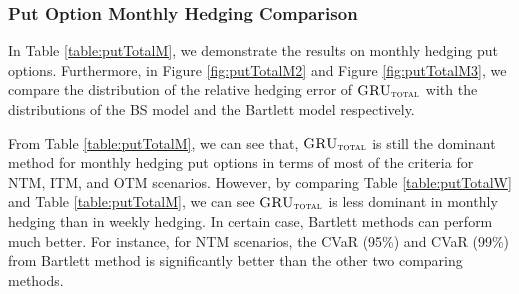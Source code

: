 \documentclass[letterpaper,12pt,titlepage,oneside,final]{book}
\numberwithin{equation}{section}
\theoremstyle{definition}
\newcommand{\modelT}{\textsc{GRU}_{\textsc{total}}}
\begin{document}
\newpage
\subsubsection{Put Option Monthly Hedging Comparison}
In Table \ref{table:putTotalM}, we demonstrate the results on monthly hedging put options. Furthermore, in Figure \ref{fig:putTotalM2} and  Figure \ref{fig:putTotalM3}, we compare the distribution of the relative hedging error of $\modelT$ with the distributions of the BS model and the Bartlett model respectively.

From Table \ref{table:putTotalM}, we can see that, $\modelT$ is still the dominant  method for monthly hedging put options in terms of most of the criteria for NTM, ITM, and OTM scenarios.  However, by comparing Table \ref{table:putTotalW} and Table \ref{table:putTotalM}, we can see $\modelT$ is less dominant in monthly hedging than in weekly hedging. In certain case, Bartlett methods can perform much better. For instance, for NTM scenarios, the CVaR (95\%) and CVaR (99\%) from Bartlett method is significantly better than the other two comparing methods. 
\end{document}
